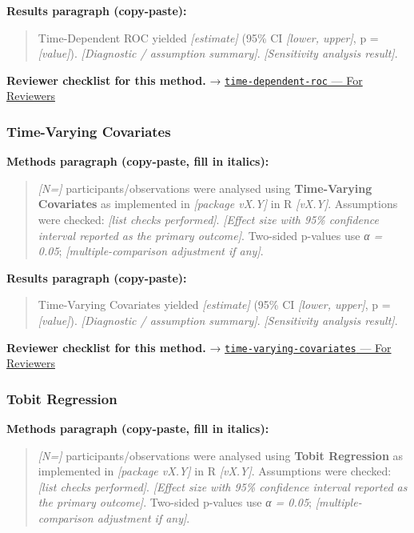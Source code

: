 \documentclass[
]{article}
\begin{document}
\textbf{Results paragraph (copy-paste):}

\begin{quote}
Time-Dependent ROC yielded \emph{{[}estimate{]}} (95\% CI
\emph{{[}lower, upper{]}}, p = \emph{{[}value{]}}). \emph{{[}Diagnostic
/ assumption summary{]}}. \emph{{[}Sensitivity analysis result{]}}.
\end{quote}

\textbf{Reviewer checklist for this method.} →
\href{../chapters/11-survival/time-dependent-roc.Rmd\#for-reviewers}{\texttt{time-dependent-roc}
--- For Reviewers}

\subsubsection{Time-Varying Covariates}\label{time-varying-covariates}

\textbf{Methods paragraph (copy-paste, fill in italics):}

\begin{quote}
\emph{{[}N={]}} participants/observations were analysed using
\textbf{Time-Varying Covariates} as implemented in \emph{{[}package
vX.Y{]}} in R \emph{{[}vX.Y{]}}. Assumptions were checked: \emph{{[}list
checks performed{]}}. \emph{{[}Effect size with 95\% confidence interval
reported as the primary outcome{]}}. Two-sided p-values use \emph{α =
0.05}; \emph{{[}multiple-comparison adjustment if any{]}}.
\end{quote}

\textbf{Results paragraph (copy-paste):}

\begin{quote}
Time-Varying Covariates yielded \emph{{[}estimate{]}} (95\% CI
\emph{{[}lower, upper{]}}, p = \emph{{[}value{]}}). \emph{{[}Diagnostic
/ assumption summary{]}}. \emph{{[}Sensitivity analysis result{]}}.
\end{quote}

\textbf{Reviewer checklist for this method.} →
\href{../chapters/11-survival/time-varying-covariates.Rmd\#for-reviewers}{\texttt{time-varying-covariates}
--- For Reviewers}

\subsubsection{Tobit Regression}\label{tobit-regression}

\textbf{Methods paragraph (copy-paste, fill in italics):}

\begin{quote}
\emph{{[}N={]}} participants/observations were analysed using
\textbf{Tobit Regression} as implemented in \emph{{[}package vX.Y{]}} in
R \emph{{[}vX.Y{]}}. Assumptions were checked: \emph{{[}list checks
performed{]}}. \emph{{[}Effect size with 95\% confidence interval
reported as the primary outcome{]}}. Two-sided p-values use \emph{α =
0.05}; \emph{{[}multiple-comparison adjustment if any{]}}.
\end{quote}
\end{document}
